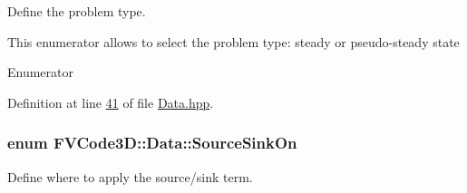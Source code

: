 Define the problem type. 

This enumerator allows to select the problem type\+: steady or pseudo-\/steady state \begin{Desc}
\item[Enumerator]\par
\begin{description}
\item[{\em 
steady\hypertarget{classFVCode3D_1_1Data_af17933074f5acdb699179763e6f43f23aa01656a6cd37ca152de831adad5d2841}{}\label{classFVCode3D_1_1Data_af17933074f5acdb699179763e6f43f23aa01656a6cd37ca152de831adad5d2841}
}]\item[{\em 
pseudo\+Steady\hypertarget{classFVCode3D_1_1Data_af17933074f5acdb699179763e6f43f23adf310b8b79bf5a11843828488cb3b46f}{}\label{classFVCode3D_1_1Data_af17933074f5acdb699179763e6f43f23adf310b8b79bf5a11843828488cb3b46f}
}]\end{description}
\end{Desc}


Definition at line \hyperlink{Data_8hpp_source_l00041}{41} of file \hyperlink{Data_8hpp_source}{Data.\+hpp}.

\subsubsection[{\texorpdfstring{Source\+Sink\+On}{SourceSinkOn}}]{\setlength{\rightskip}{0pt plus 5cm}enum {\bf F\+V\+Code3\+D\+::\+Data\+::\+Source\+Sink\+On}\hspace{0.3cm}{\ttfamily [strong]}}\hypertarget{classFVCode3D_1_1Data_a4d66e2e205b350cb240820540339e1a3}{}\label{classFVCode3D_1_1Data_a4d66e2e205b350cb240820540339e1a3}


Define where to apply the source/sink term. 

